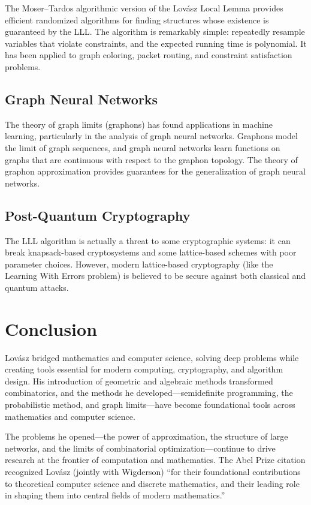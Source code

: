 The Moser--Tardos algorithmic version of the Lov\'asz Local Lemma provides efficient randomized algorithms for finding structures whose existence is guaranteed by the LLL. The algorithm is remarkably simple: repeatedly resample variables that violate constraints, and the expected running time is polynomial. It has been applied to graph coloring, packet routing, and constraint satisfaction problems.

\subsection{Graph Neural Networks}

The theory of graph limits (graphons) has found applications in machine learning, particularly in the analysis of graph neural networks. Graphons model the limit of graph sequences, and graph neural networks learn functions on graphs that are continuous with respect to the graphon topology. The theory of graphon approximation provides guarantees for the generalization of graph neural networks.

\subsection{Post-Quantum Cryptography}

The LLL algorithm is actually a threat to some cryptographic systems: it can break knapsack-based cryptosystems and some lattice-based schemes with poor parameter choices. However, modern lattice-based cryptography (like the Learning With Errors problem) is believed to be secure against both classical and quantum attacks.

\section{Conclusion}

Lov\'asz bridged mathematics and computer science, solving deep problems while creating tools essential for modern computing, cryptography, and algorithm design. His introduction of geometric and algebraic methods transformed combinatorics, and the methods he developed---semidefinite programming, the probabilistic method, and graph limits---have become foundational tools across mathematics and computer science.

The problems he opened---the power of approximation, the structure of large networks, and the limits of combinatorial optimization---continue to drive research at the frontier of computation and mathematics. The Abel Prize citation recognized Lov\'asz (jointly with Wigderson) ``for their foundational contributions to theoretical computer science and discrete mathematics, and their leading role in shaping them into central fields of modern mathematics.''

